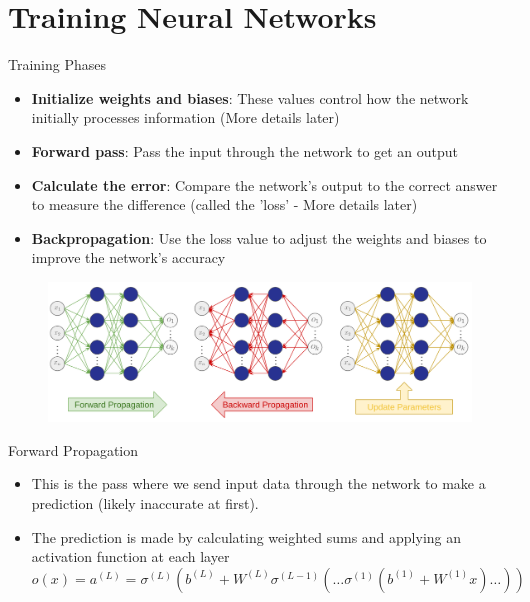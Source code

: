 \documentclass[serif, aspectratio=169]{beamer}
\begin{document}
\section{Training Neural Networks}
\begin{frame}{Training Phases}
    \begin{itemize}
        \item \textbf{Initialize weights and biases}: These values control how the network initially processes information (More details later)
        \item \textbf{Forward pass}: Pass the input through the network to get an output
        \item \textbf{Calculate the error}: Compare the network's output to the correct answer to measure the difference (called the 'loss' - More details later) 
        \item \textbf{Backpropagation}: Use the loss value to adjust the weights and biases to improve the network's accuracy
    \end{itemize}
    \begin{figure}[bh]
            \includegraphics[keepaspectratio, scale=0.2]{pic/4/training-phases.png}
    \end{figure}
\end{frame}

\begin{frame}[t]{Forward Propagation}
    \begin{itemize}
        \item This is the pass where we send input data through the network to make a prediction (likely inaccurate at first).
        \item The prediction is made by calculating weighted sums and applying an activation function at each layer
        $$ o(x) = a^{(L)} = \sigma^{(L)}\left( b^{(L)} + W^{(L)}  \sigma^{(L-1)}\left( \ldots \sigma^{(1)}(b^{(1)} + W^{(1)}  x)  \ldots \right) \right) $$
    \end{itemize}
\end{frame}
\end{document}
